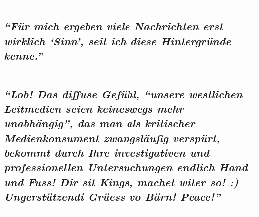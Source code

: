 \begin{center}\rule{0.5\linewidth}{\linethickness}\end{center}

\hypertarget{fuxfcr-mich-ergeben-viele-nachrichten-erst-wirklich-sinn-seit-ich-diese-hintergruxfcnde-kenne}{%
\subsection{\texorpdfstring{\emph{``Für mich ergeben viele Nachrichten
erst wirklich `Sinn', seit ich diese Hintergründe
kenne.''}}{``Für mich ergeben viele Nachrichten erst wirklich `Sinn', seit ich diese Hintergründe kenne.''}}\label{fuxfcr-mich-ergeben-viele-nachrichten-erst-wirklich-sinn-seit-ich-diese-hintergruxfcnde-kenne}}

\begin{center}\rule{0.5\linewidth}{\linethickness}\end{center}

\hypertarget{lob-das-diffuse-gefuxfchl-unsere-westlichen-leitmedien-seien-keineswegs-mehr-unabhuxe4ngig-das-man-als-kritischer-medienkonsument-zwangsluxe4ufig-verspuxfcrt-bekommt-durch-ihre-investigativen-und-professionellen-untersuchungen-endlich-hand-und-fuss-dir-sit-kings-machet-witer-so--ungerstuxfctzendi-gruxfcess-vo-buxe4rn-peace}{%
\subsection{\texorpdfstring{\emph{``Lob! Das diffuse Gefühl, ``unsere
westlichen Leitmedien seien keineswegs mehr unabhängig'', das man als
kritischer Medienkonsument zwangsläufig verspürt, bekommt durch Ihre
investigativen und professionellen Untersuchungen endlich Hand und Fuss!
Dir sit Kings, machet witer so! :) Ungerstützendi Grüess vo Bärn!
Peace!''}}{``Lob! Das diffuse Gefühl, ``unsere westlichen Leitmedien seien keineswegs mehr unabhängig'', das man als kritischer Medienkonsument zwangsläufig verspürt, bekommt durch Ihre investigativen und professionellen Untersuchungen endlich Hand und Fuss! Dir sit Kings, machet witer so! :) Ungerstützendi Grüess vo Bärn! Peace!''}}\label{lob-das-diffuse-gefuxfchl-unsere-westlichen-leitmedien-seien-keineswegs-mehr-unabhuxe4ngig-das-man-als-kritischer-medienkonsument-zwangsluxe4ufig-verspuxfcrt-bekommt-durch-ihre-investigativen-und-professionellen-untersuchungen-endlich-hand-und-fuss-dir-sit-kings-machet-witer-so--ungerstuxfctzendi-gruxfcess-vo-buxe4rn-peace}}

\begin{center}\rule{0.5\linewidth}{\linethickness}\end{center}

